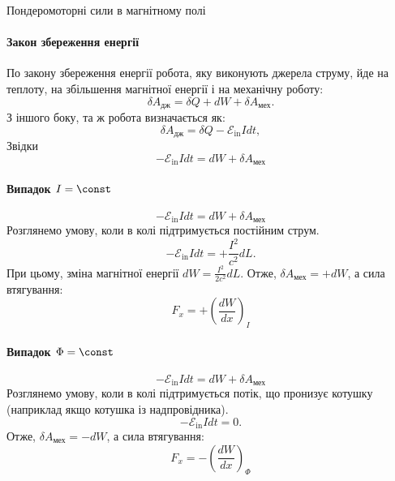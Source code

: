 \documentclass[onlytextwidth]{beamer}
\begin{document}
\begin{frame}{Пондеромоторні сили в магнітному полі}{}
	\framesubtitle<1>{Закон збереження енергії}
	\begin{center}
	\end{center}
	\begin{overprint}
		\begin{block}{}\justifying
			По \alert{закону збереження енергії} \alert{робота, яку виконують джерела струму}, йде на теплоту, на збільшення магнітної енергії і на
			механічну роботу:
			\begin{equation*}
				\delta A_\text{дж} = \delta Q + dW + \delta A_\text{мех}.
			\end{equation*}
			З іншого боку, та ж робота визначається як:
			\begin{equation*}
				\delta A_\text{дж} = \delta Q - \mathcal{E}_\text{in} I dt,
			\end{equation*}
			Звідки
			\begin{equation*}
				- \mathcal{E}_\text{in} I dt = dW + \delta A_\text{мех}
			\end{equation*}
		\end{block}
		\framesubtitle<2>{Випадок $I = \const$}
		\begin{equation*}
			-\mathcal{E}_\text{in} I dt = dW + \delta A_\text{мех}
		\end{equation*}
		Розглянемо умову, коли в колі підтримується постійним струм.
		\begin{equation*}
			- \mathcal{E}_\text{in} I dt = + \frac{I^2}{c^2} dL.
		\end{equation*}
		При цьому, зміна магнітної енергії $dW = \frac{I^2}{2c^2} dL$. Отже, $\delta A_\text{мех} = + dW$, а сила втягування:
		\begin{equation*}
			F_x = + \left( \frac{d W}{dx} \right)_{I}
		\end{equation*}
		\framesubtitle<3>{Випадок $\Phi = \const$}
		\begin{equation*}
			-\mathcal{E}_\text{in} I dt = dW + \delta A_\text{мех}
		\end{equation*}
		Розглянемо умову, коли в колі підтримується потік, що пронизує котушку (наприклад якщо котушка із надпровідника).
		\begin{equation*}
			- \mathcal{E}_\text{in} I dt = 0.
		\end{equation*}
		Отже, $\delta A_\text{мех} = - dW$, а сила втягування:
		\begin{equation*}
			F_x = - \left( \frac{dW}{dx} \right)_{\Phi}
		\end{equation*}
	\end{overprint}
\end{frame}
\end{document}
